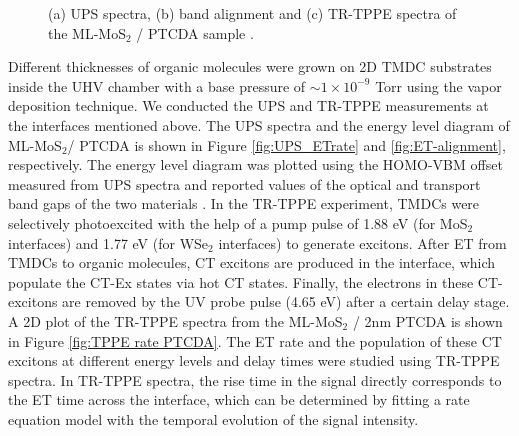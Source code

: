 \documentclass[12pt]{article}
\begin{document}
\begin{figure}[H]
\caption{(a) UPS spectra, (b) band alignment and (c) TR-TPPE spectra of the ML-MoS$_2$ / PTCDA sample \cite{rijal2020collective}.}\label{fig:ET UPS TPPE}
\end{figure}

Different thicknesses of organic molecules were grown on 2D TMDC substrates inside the UHV chamber with a base pressure of $\sim 1 \times 10^{-9}$ Torr using the vapor deposition technique. We conducted the UPS and TR-TPPE measurements at the interfaces mentioned above. The UPS spectra and the energy level diagram of ML-MoS$_2$/ PTCDA  is shown in Figure \ref{fig:UPS_ETrate} and \ref{fig:ET-alignment}, respectively. The energy level diagram was plotted using the HOMO-VBM offset measured from UPS spectra and reported values of the optical and transport band gaps of the two materials \cite{martinez2014imaging,forker2009optical,park2018direct}. In the TR-TPPE experiment, TMDCs were selectively photoexcited with the help of a pump pulse of 1.88 eV (for MoS$_2$ interfaces) and 1.77 eV (for WSe$_2$ interfaces) to generate excitons. After ET from TMDCs to organic molecules, CT excitons are produced in the interface, which populate the CT-Ex states via hot CT states. Finally, the electrons in these CT-excitons are removed by the UV probe pulse (4.65 eV) after a certain delay stage. A 2D plot of the TR-TPPE spectra from the ML-MoS$_2$ / 2nm PTCDA is shown in Figure \ref{fig:TPPE rate PTCDA}. The ET rate and the population of these CT excitons at different energy levels and delay times were studied using TR-TPPE spectra. In TR-TPPE spectra, the rise time in the signal directly corresponds to the ET time across the interface, which can be determined by fitting a rate equation model with the temporal evolution of the signal intensity.
\end{document}
